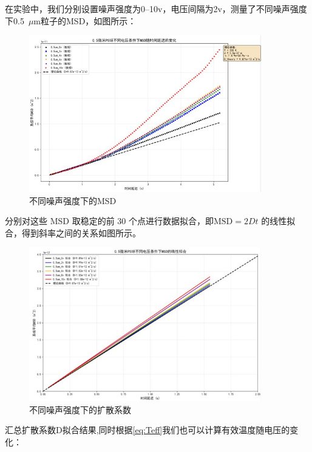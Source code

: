 \documentclass[a4paper]{report} %
\begin{document}
在实验中，我们分别设置噪声强度为0--10v，电压间隔为2v，测量了不同噪声强度下0.5~$\mu$m粒子的MSD，如图所示：\par
\begin{figure}[H]
    \centering
    \includegraphics[width=0.9\textwidth]{不同噪声强度下的MSD.jpg}
    \caption{不同噪声强度下的MSD}
    \label{fig:msdnoise}
\end{figure}
分别对这些 MSD 取稳定的前 30 个点进行数据拟合，即$\text{MSD} = 2Dt$
的线性拟合，得到斜率之间的关系如图所示。
\begin{figure}[H]
    \centering
    \includegraphics[width=0.9\textwidth]{不同噪声强度下的扩散系数.jpg}
    \caption{不同噪声强度下的扩散系数}
    \label{fig:diffusionnoise}
\end{figure}
汇总扩散系数D拟合结果,同时根据\eqref{eq:Teff}我们也可以计算有效温度随电压的变化：
\end{document}
